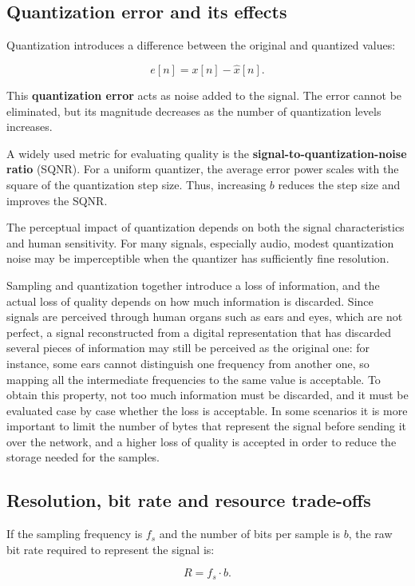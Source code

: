 \documentclass[11pt,a4paper,openany]{report}
\begin{document}
\subsection{Quantization error and its effects}

Quantization introduces a difference between the original and quantized values:

\[ e[n] = x[n] - \hat{x}[n]. \]

This \textbf{quantization error} acts as noise added to the signal. The error cannot be eliminated, but its magnitude decreases as the number of quantization levels increases.

A widely used metric for evaluating quality is the \textbf{signal-to-quantization-noise ratio} (SQNR). For a uniform quantizer, the average error power scales with the square of the quantization step size. Thus, increasing $b$ reduces the step size and improves the SQNR.

The perceptual impact of quantization depends on both the signal characteristics and human sensitivity. For many signals, especially audio, modest quantization noise may be imperceptible when the quantizer has sufficiently fine resolution.

Sampling and quantization together introduce a loss of information, and the actual loss of quality depends on how much information is discarded. Since signals are perceived through human organs such as ears and eyes, which are not perfect, a signal reconstructed from a digital representation that has discarded several pieces of information may still be perceived as the original one: for instance, some ears cannot distinguish one frequency from another one, so mapping all the intermediate frequencies to the same value is acceptable. To obtain this property, not too much information must be discarded, and it must be evaluated case by case whether the loss is acceptable. In some scenarios it is more important to limit the number of bytes that represent the signal before sending it over the network, and a higher loss of quality is accepted in order to reduce the storage needed for the samples.
\subsection{Resolution, bit rate and resource trade-offs}

If the sampling frequency is $f_s$ and the number of bits per sample is $b$, the raw bit rate required to represent the signal is:

\[ R = f_s \cdot b. \]
\end{document}
